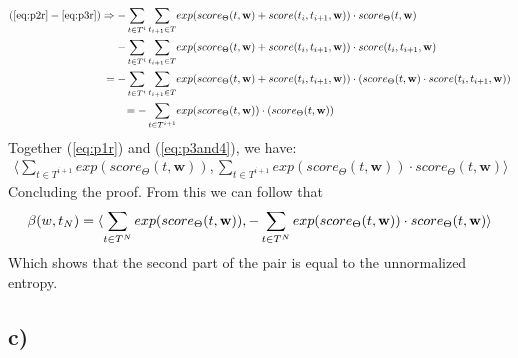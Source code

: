 \documentclass[a4paper,12pt]{ETHexercise}
\begin{document}
\begin{align}
    (\ref{eq:p2r} - \ref{eq:p3r}) \Rightarrow -\sum_{t \in T^i} \sum_{t_{i+1}\in T} &exp(score_\Theta(t,\textbf{w}) + score(t_{i}, t_{i+1}, \textbf{w})) \cdot score_\Theta(t,\textbf{w})\\
    -\sum_{t \in T^i} \sum_{t_{i+1}\in T} &exp(score_\Theta(t,\textbf{w}) + score(t_{i}, t_{i+1}, \textbf{w})) \cdot score(t_{i}, t_{i+1}, \textbf{w})\\
    = -\sum_{t \in T^i} \sum_{t_{i+1}\in T} &exp(score_\Theta(t,\textbf{w}) + score(t_{i}, t_{i+1}, \textbf{w})) \cdot (score_\Theta(t,\textbf{w}) \cdot score(t_{i}, t_{i+1}, \textbf{w})) \\
    = -\sum_{t \in T^{i+1}} &exp(score_\Theta(t,\textbf{w})) \cdot (score_\Theta(t,\textbf{w})) \label{eq:p3and4}
\end{align}
Together (\ref{eq:p1r}) and (\ref{eq:p3and4}), we have:
\begin{align}
    \langle \sum_{t \in T^{i+1}} exp(score_\Theta(t,\textbf{w})) , \sum_{t \in T^{i+1}} exp(score_\Theta(t,\textbf{w})) \cdot score_\Theta(t,\textbf{w}) \rangle
\end{align}
Concluding the proof.
From this we can follow that
\begin{align}
    \beta(w, t_{N}) = \langle\sum_{t \in T^N} exp(score_\Theta(t,\textbf{w})), -\sum_{t \in T^N} exp(score_\Theta(t,\textbf{w})) \cdot score_\Theta(t,\textbf{w})\rangle
\end{align}
Which shows that the second part of the pair is equal to the unnormalized entropy. 
\subsection*{c)}
\end{document}
